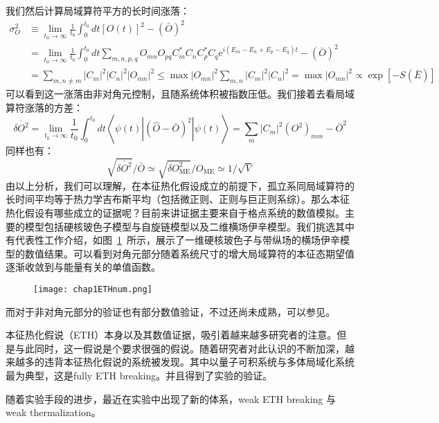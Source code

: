 我们然后计算局域算符平方的长时间涨落：
\begin{equation}
\begin{aligned}
\sigma_{O}^{2} & \equiv \lim _{t_{0} \rightarrow \infty} \frac{1}{t_{0}} \int_{0}^{t_{0}} d t[O(t)]^{2}-(\bar{O})^{2} \\
&=\lim _{t_{0} \rightarrow \infty} \frac{1}{t_{0}} \int_{0}^{t_{0}} d t \sum_{m, n, p, q} O_{m n} O_{p q} C_{m}^{*} C_{n} C_{p}^{*} C_{q} \mathrm{e}^{i\left(E_{m}-E_{n}+E_{p}-E_{q}\right) t}-(\bar{O})^{2} \\
&=\sum_{m, n \neq m}\left|C_{m}\right|^{2}\left|C_{n}\right|^{2}\left|O_{m n}\right|^{2} \leq \max \left|O_{m n}\right|^{2} \sum_{m, n}\left|C_{m}\right|^{2}\left|C_{n}\right|^{2}=\max \left|O_{m n}\right|^{2} \propto \exp [-S(\bar{E})]
\end{aligned}
\end{equation}
可以看到这一涨落由非对角元控制，且随系统体积被指数压低。我们接着去看局域算符涨落的方差：
\begin{equation}
\overline{\delta O^{2}}=\lim _{t_{0} \rightarrow \infty} \frac{1}{t_{0}} \int_{0}^{t_{0}} d t\left\langle\psi(t)\left|(\hat{O}-\bar{O})^{2}\right| \psi(t)\right\rangle=\sum_{m}\left|C_{m}\right|^{2}\left(O^{2}\right)_{m m}-\bar{O}^{2}
\end{equation}
同样也有：
\begin{equation}
\sqrt{\overline{\delta O^{2}}} / \bar{O} \simeq \sqrt{\delta O_{\mathrm{ME}}^{2}} / O_{\mathrm{ME}} \simeq 1 / \sqrt{V}
\end{equation}
由以上分析，我们可以理解，在本征热化假设成立的前提下，孤立系同局域算符的长时间平均等于热力学吉布斯平均（包括微正则、正则与巨正则系综）。那么本征热化假设有哪些成立的证据呢？目前来讲证据主要来自于格点系统的数值模拟。主要的模型包括硬核玻色子模型与自旋链模型以及二维横场伊辛模型\cite{}。我们挑选其中有代表性工作介绍，如图~\ref{ETHnum}~所示，展示了一维硬核玻色子与带纵场的横场伊辛模型的数值结果\cite{Kim2014testing}。可以看到对角元部分随着系统尺寸的增大局域算符的本征态期望值逐渐收敛到与能量有关的单值函数。

\begin{figure}[!htbp]
    \centering
    \texttt{[image: chap1ETHnum.png]}
    \label{ETHnum}
\end{figure}
而对于非对角元部分的验证也有部分数值验证，不过还尚未成熟，可以参见\cite{}。

本征热化假说（ETH）本身以及其数值证据，吸引着越来越多研究者的注意。但是与此同时，这一假说是个要求很强的假说。随着研究者对此认识的不断加深，越来越多的违背本征热化假说的系统被发现。其中以量子可积系统与多体局域化系统最为典型，这是fully ETH breaking。并且得到了实验的验证。


随着实验手段的进步，最近在实验中出现了新的体系，weak ETH breaking 与 weak thermalization。





